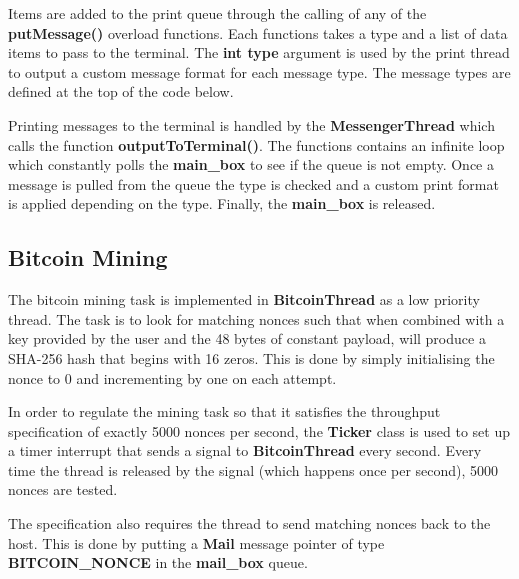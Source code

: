 \documentclass{article}
\begin{document}
\bigskip

\noindent
Items are added to the print queue through the calling of any of the \textbf{putMessage()} overload functions. Each functions takes a type and a list of data items to pass to the terminal. The \textbf{int type} argument is used by the print thread to output a custom message format for each message type. The message types are defined at the top of the code below.

\bigskip

\bigskip

\noindent
Printing messages to the terminal is handled by the \textbf{MessengerThread} which calls the function \textbf{outputToTerminal()}. The functions contains an infinite loop which constantly polls the \textbf{main\_box} to see if the queue is not empty. Once a message is pulled from the queue the type is checked and a custom print format is applied depending on the type. Finally, the \textbf{main\_box} is released.


\bigskip

\bigskip


\subsection{Bitcoin Mining}

\noindent
The bitcoin mining task is implemented in \textbf{BitcoinThread} as a low priority thread. The task is to look for matching nonces such that when combined with a key provided by the user and the 48 bytes of constant payload, will produce a SHA-256 hash that begins with 16 zeros. This is done by simply initialising the nonce to 0 and incrementing by one on each attempt.

\bigskip

\noindent
In order to regulate the mining task so that it satisfies the throughput specification of exactly 5000 nonces per second, the \textbf{Ticker} class is used to set up a timer interrupt that sends a signal to \textbf{BitcoinThread} every second. Every time the thread is released by the signal (which happens once per second), 5000 nonces are tested.

\bigskip

\noindent
The specification also requires the thread to send matching nonces back to the host. This is done by putting a \textbf{Mail} message pointer of type \textbf{BITCOIN\_NONCE} in the \textbf{mail\_box} queue.

\bigskip


\end{document}
